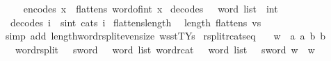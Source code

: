 \begin{isabellebody}
\ \ \isanewline
\ \ {\isachardoublequoteopen}encode{\isacharunderscore}{\kern0pt}s{}{}\ x\ {\isasymequiv}\ flatten{\isacharunderscore}{\kern0pt}s{}{}\ {\isacharparenleft}{\kern0pt}word{\isacharunderscore}{\kern0pt}of{\isacharunderscore}{\kern0pt}int\ x{\isacharparenright}{\kern0pt}{\isachardoublequoteclose}\isanewline
\isanewline
{}\isamarkupfalse%
\ decode{\isacharunderscore}{\kern0pt}s{}{}\ {\isacharcolon}{\kern0pt}{\isacharcolon}{\kern0pt}\ {\isachardoublequoteopen}{}\ word\ list\ {\isasymRightarrow}\ int{\isachardoublequoteclose}\isanewline
\ \ \isanewline
\ \ {\isachardoublequoteopen}decode{\isacharunderscore}{\kern0pt}s{}{}\ i\ {\isasymequiv}\ sint\ {\isacharparenleft}{\kern0pt}cat{\isacharunderscore}{\kern0pt}s{}{}\ i{\isacharparenright}{\kern0pt}{\isachardoublequoteclose}\isanewline
\isanewline
{}\isamarkupfalse%
\ flatten{\isacharunderscore}{\kern0pt}s{}{}{\isacharunderscore}{\kern0pt}length{\isacharcolon}{\kern0pt}\isanewline
\ \ {\isachardoublequoteopen}length\ {\isacharparenleft}{\kern0pt}flatten{\isacharunderscore}{\kern0pt}s{}{}\ vs{\isacharparenright}{\kern0pt}\ {\isacharequal}{\kern0pt}\ {}{\isachardoublequoteclose}\isanewline
%
\isadelimproof
\ \ %
\endisadelimproof
%
\isatagproof
{}\isamarkupfalse%
\ {\isacharparenleft}{\kern0pt}simp\ add{\isacharcolon}{\kern0pt}\ length{\isacharunderscore}{\kern0pt}word{\isacharunderscore}{\kern0pt}rsplit{\isacharunderscore}{\kern0pt}even{\isacharunderscore}{\kern0pt}size\ wsst{\isacharunderscore}{\kern0pt}TYs{\isacharparenleft}{\kern0pt}{}{\isacharparenright}{\kern0pt}{\isacharparenright}{\kern0pt}%
\endisatagproof
{\isafoldproof}%
%
\isadelimproof
\isanewline
%
\endisadelimproof
\isanewline
{}\isamarkupfalse%
\ rsplit{\isacharunderscore}{\kern0pt}rcat{\isacharunderscore}{\kern0pt}s{}{}{\isacharunderscore}{\kern0pt}eq{\isacharcolon}{\kern0pt}\isanewline
\ \ \ {\isachardoublequoteopen}w\ {\isacharequal}{\kern0pt}\ {\isacharbrackleft}{\kern0pt}a{}{\isacharcomma}{\kern0pt}\ a{}{\isacharcomma}{\kern0pt}\ b{}{\isacharcomma}{\kern0pt}\ b{}{\isacharbrackright}{\kern0pt}{\isachardoublequoteclose}\isanewline
\ \ \ {\isachardoublequoteopen}{\isacharparenleft}{\kern0pt}word{\isacharunderscore}{\kern0pt}rsplit\ {\isacharcolon}{\kern0pt}{\isacharcolon}{\kern0pt}\ {}{}\ sword\ {\isasymRightarrow}\ {}\ word\ list{\isacharparenright}{\kern0pt}\ {\isacharparenleft}{\kern0pt}{\isacharparenleft}{\kern0pt}word{\isacharunderscore}{\kern0pt}rcat\ {\isacharcolon}{\kern0pt}{\isacharcolon}{\kern0pt}\ {}\ word\ list\ {\isasymRightarrow}\ {}{}\ sword{\isacharparenright}{\kern0pt}\ w{\isacharparenright}{\kern0pt}\ {\isacharequal}{\kern0pt}\ w{\isachardoublequoteclose}\ \isanewline

\end{isabellebody}
